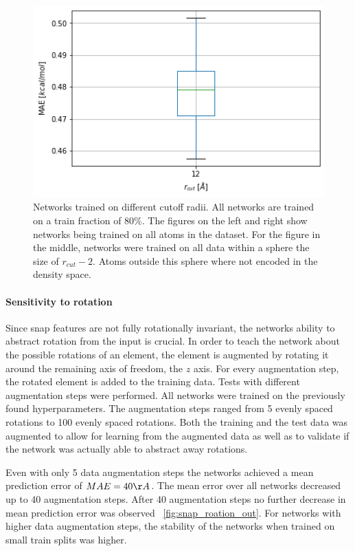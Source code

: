 \begin{figure}[!htb]
  \endminipage\hfill
    \includegraphics[width=1.0\textwidth]{figures/regression/snap/cut_12.png}
  \endminipage
  \caption{
  Networks trained on different cutoff radii. All networks are trained on a train fraction of 80\%.
  The figures on the left and right show networks being trained on all atoms in the dataset.
  For the figure in the middle, networks were trained on all data within a sphere the size of
  $r_{cut} - 2$. Atoms outside this sphere where not encoded in the density space.
  }
  \label{fig:snap_hyperparameter}
\end{figure}


\paragraph{Sensitivity to rotation}
Since snap features are not fully rotationally invariant, the networks ability to abstract rotation from the input is crucial.
In order to teach the network about the possible rotations of an element, 
the element is augmented by rotating it around the remaining axis of freedom, the $z$ axis.
For every augmentation step, the rotated element is added to the training data.
Tests with different augmentation steps were performed.
All networks were trained on the previously found hyperparameters.
The augmentation steps ranged from 5 evenly spaced rotations to 100 evenly spaced rotations.
Both the training and the test data was augmented to allow for learning from the augmented data
as well as to validate if the network was actually able to abstract away rotations.

Even with only 5 data augmentation steps the networks achieved a mean prediction error of $MAE = 40 \AA$.
The mean error over all networks decreased up to 40 augmentation steps.
After 40 augmentation steps no further decrease in mean prediction error was observed ~\ref{fig:snap_roation_out}.
For networks with higher data augmentation steps, the stability of the networks when trained on small train splits was higher.

